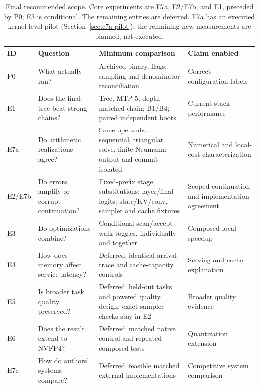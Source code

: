 \documentclass[conference]{IEEEtran}
\begin{document}
\begin{table}[t]
\caption{Final recommended scope. Core experiments are E7a, E2/E7b, and E1, preceded by P0; E3 is conditional. The remaining entries are deferred. E7a has an executed kernel-level pilot (Section~\ref{sec:e7a-pilot}); the remaining new measurements are planned, not executed.}
\label{tab:planned}
\centering\footnotesize
\begin{tabularx}{\textwidth}{@{}p{}p{}Y>{\raggedright\arraybackslash}p{0.20\textwidth}@{}}
\toprule
ID & Question & Minimum comparison & Claim enabled \\
\midrule
P0 & What actually ran? & Archived binary, flags, sampling and denominator reconciliation & Correct configuration labels \\
E1 & Does the final tree beat strong chains? & Tree, MTP-5, depth-matched chain; B1/B4; paired independent boots & Current-stack performance \\
E7a & Do arithmetic realizations agree? & Same operands: sequential, triangular solve, finite-Neumann; output and commit isolated & Numerical and local-cost characterization \\
E2/E7b & Do errors amplify or corrupt continuation? & Fixed-prefix stage substitutions; layer/final logits; state/KV/conv, sampler and cache fixtures & Scoped continuation and implementation agreement \\
E3 & Do optimizations combine? & Conditional scan/accept-walk toggles, individually and together & Composed local speedup \\
E4 & How does memory affect service latency? & Deferred: identical arrival trace and cache-capacity controls & Serving and cache explanation \\
E5 & Is broader task quality preserved? & Deferred: held-out tasks and powered quality design; exact sampler checks stay in E2 & Broader quality evidence \\
E6 & Does the result extend to NVFP4? & Deferred: matched native control and repeated composed tests & Quantization extension \\
E7c & How do authors' systems compare? & Deferred: feasible matched external implementations & Competitive system comparison \\
\bottomrule
\end{tabularx}
\end{table}
\end{document}
